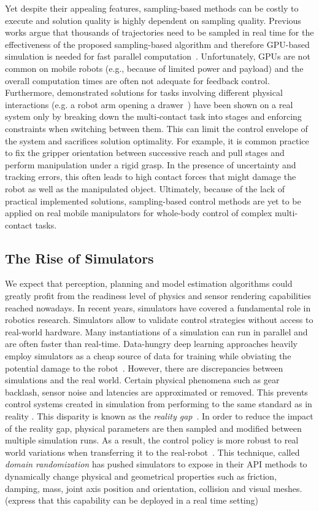 Yet despite their appealing features, sampling-based methods can be costly to execute and solution quality is highly dependent on sampling quality. Previous works argue that thousands of trajectories need to be sampled in real time for the effectiveness of the proposed sampling-based algorithm and therefore GPU-based simulation is needed for fast parallel computation~\cite{williams_model_2017}. Unfortunately, GPUs are not common on mobile robots (e.g., because of limited power and payload) and the overall computation times are often not adequate for feedback control. 
Furthermore, demonstrated solutions for tasks involving different physical interactions (e.g. a robot arm opening a drawer~\cite{abraham_model-based_2020}) have been shown on a real system only by breaking down the multi-contact task into stages and enforcing constraints when switching between them. 
This can limit the control envelope of the system and sacrifices solution optimality. For example, it is common practice to fix the gripper orientation between successive reach and pull stages and perform manipulation under a rigid grasp. In the presence of uncertainty and tracking errors, this often leads to high contact forces that might damage the robot as well as the manipulated object.
Ultimately, because of the lack of practical implemented solutions, sampling-based control methods are yet to be applied on real mobile manipulators for whole-body control of complex multi-contact tasks.   


\subsection{The Rise of Simulators}
We expect that perception, planning and model estimation algorithms could greatly profit from the readiness level of physics and sensor rendering capabilities reached nowadays.  
In recent years, simulators have covered a fundamental role in robotics research. Simulators allow to validate control strategies without access to real-world hardware. Many instantiations of a simulation can run in parallel and are often faster than real-time. Data-hungry deep learning approaches heavily employ simulators as a cheap source of data for training while obviating the potential damage to the robot~\cite{liang_gpu-accelerated_2018}. However, there are discrepancies between simulations and the real world. Certain physical phenomena such as gear backlash, sensor noise and latencies are approximated or removed. This prevents control systems created in simulation from performing to the same standard as in reality \cite{collins_benchmarking_2020}. This disparity is known as the \emph{reality gap}~\cite{hofer2021sim2real}. In order to reduce the impact of the reality gap, physical parameters are then sampled and modified between multiple simulation runs. As a result, the control policy is more robust to real world variations when transferring it to the real-robot~\cite{andrychowicz2020learning}. This technique, called \emph{domain randomization} has pushed simulators to expose in their API methods to dynamically change physical and geometrical properties such as friction, damping, mass, joint axis position and orientation, collision and visual meshes. (express that this capability can be deployed in a real time setting) 

